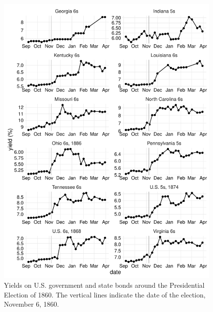 \documentclass[]{article}\usepackage[]{graphicx}\usepackage[]{color}
\begin{document}
\begin{figure}
  \centering
  \includegraphics[width=\textwidth]{./figures/fig_yields_election-1}
\caption[Yields on U.S. government and state bonds around the Presidential Election of 1860]{
  Yields on U.S. government and state bonds around the Presidential Election of 1860.
  The vertical lines indicate the date of the election, November 6, 1860.
}
\label{fig:yields_election}
\end{figure}
\end{document}
